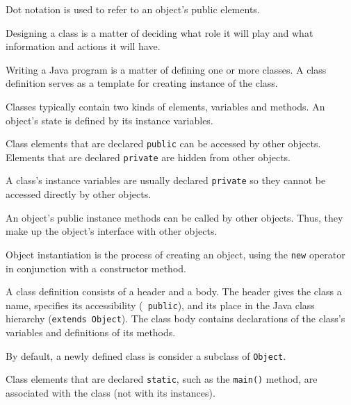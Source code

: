 

\begin{SMBL}

\item Dot notation is used to refer to an object's public elements. 

\item Designing a class is a matter of deciding what role it
will play and what information and actions it will have. 

\item  Writing a Java program is a matter of defining one or
more classes. A class definition serves as a template for creating
instance of the class.  

\item Classes typically contain two kinds of elements, variables and
methods. An object's state is defined by its instance variables.

\item Class elements that are declared {\tt public} can be
accessed by other objects. Elements that are declared {\tt private}
are hidden from other objects.

\item A class's instance variables are usually declared {\tt private}
so they cannot be accessed directly by other objects.

\item An object's public instance methods can be called by other objects.
Thus, they make up the object's interface with other objects.

\item Object instantiation is the process of creating an object,
using the {\tt new} operator in conjunction with a constructor method.

\item A class definition consists of a header and a body. The
header gives the class a name, specifies its accessibility ({\tt
public}), and its place in the Java class hierarchy ({\tt extends
Object}). The class body contains declarations of the class's
variables and definitions of its methods.

\item By default, a newly defined class is consider a subclass of {\tt Object}.

\item Class elements that are declared {\tt static}, such as the
{\tt main()} method, are associated with the class (not with its
instances).


\end{SMBL}
